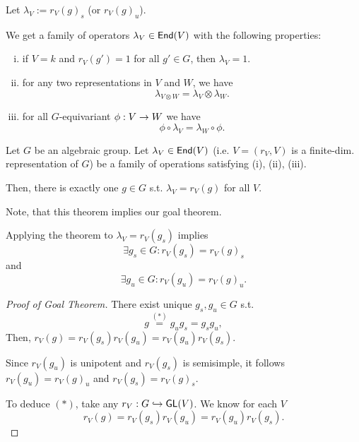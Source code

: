 Let $\lambda_V := r_V(g)_s$ (or $r_V(g)_u$).

We get a family of operators $\lambda_V \in \textsf{End}(V)$ with the following properties:
\begin{enumerate}[(i)]
	\item if $V = k$ and $r_V(g') = 1$ for all $g' \in G$, then $\lambda_V = 1$.
	\item for any two representations in $V$ and $W$, we have
	\[\lambda_{V\otimes W} = \lambda_V \otimes \lambda_W.\]
	\item for all $G$-equivariant $\phi : V \overset{}{\rightarrow} W$ we have
	\[ \phi \circ \lambda_V = \lambda_W \circ  \phi. \]
\end{enumerate}

\begin{theorem}
Let $G$ be an algebraic group. Let $\lambda_V \in \textsf{End}(V)$ (i.e. $V = (r_V, V)$ is a finite-dim. representation of $G$) be a family of operations satisfying (i), (ii), (iii).

Then, there is exactly one $g \in G$ s.t. $\lambda_V = r_V(g)$ for all $V$.
\end{theorem}
Note, that this theorem implies our goal theorem.

Applying the theorem to $\lambda_V = r_V(g_s)$ implies
\[ \exists g_s \in G: r_V(g_s) = r_V(g)_s \]
and
\[ \exists g_u \in G: r_V(g_u) = r_V(g)_u. \]

\begin{proof}[Proof of Goal Theorem]
There exist unique $g_s, g_u \in G$ s.t.
\[ g \overset{(*)}{=} g_u g_s = g_s g_u, \]
Then, $r_V(g) = r_V(g_s) r_V(g_u) = r_V(g_u) r_V(g_s)$.

Since $r_V(g_u)$ is unipotent and $r_V(g_s)$ is semisimple, it follows $r_V(g_u) = r_V(g)_u$ and $r_V(g_s) = r_V(g)_s$.

To deduce $(*)$, take any $r_V:G \overset{}{\hookrightarrow} \textsf{GL}(V)$. We know for each $V$
\[ r_V(g) = r_V(g_s) r_V(g_u) = r_V(g_u)r_V(g_s). \]
\end{proof}

